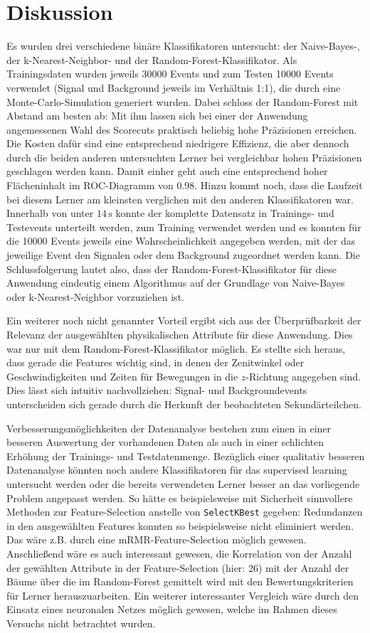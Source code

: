 \section{Diskussion}
\label{sec:Diskussion}

Es wurden drei verschiedene binäre Klassifikatoren untersucht: der Naive-Bayes-, der k-Nearest-Neighbor- und der Random-Forest-Klassifikator. Als Trainingsdaten wurden jeweils 30000 Events und zum Testen 10000 Events verwendet (Signal und Background jeweils im Verhältnis 1:1), die durch eine Monte-Carlo-Simulation generiert wurden. Dabei schloss der Random-Forest mit Abstand am besten ab: Mit ihm lassen sich bei einer der Anwendung angemessenen Wahl des Scorecuts praktisch beliebig hohe Präzisionen erreichen. Die Kosten dafür sind eine entsprechend niedrigere Effizienz, die aber dennoch durch die beiden anderen untersuchten Lerner bei vergleichbar hohen Präzisionen geschlagen werden kann. Damit einher geht auch eine entsprechend hoher Flächeninhalt im ROC-Diagramm von 0.98. Hinzu kommt noch, dass die Laufzeit bei diesem Lerner am kleinsten verglichen mit den anderen Klassifikatoren war. Innerhalb von unter $14 \, \text{s}$ konnte der komplette Datensatz in Trainings- und  Testevents unterteilt werden, zum Training verwendet werden und es konnten für die 10000 Events jeweils eine Wahrscheinlichkeit angegeben werden, mit der das jeweilige Event den Signalen oder dem Background zugeordnet werden kann. Die Schlussfolgerung lautet also, dass der Random-Forest-Klassifikator für diese Anwendung eindeutig einem Algorithmus auf der Grundlage von Naive-Bayes oder k-Nearest-Neighbor vorzuziehen ist.

Ein weiterer noch nicht genannter Vorteil ergibt sich aus der Überprüfbarkeit der Relevanz der ausgewählten physikalischen Attribute für diese Anwendung. Dies war nur mit dem Random-Forest-Klassifikator möglich. Es stellte sich heraus, dass gerade die Features wichtig sind, in denen der Zenitwinkel oder Geschwindigkeiten und Zeiten für Bewegungen in die $z$-Richtung angegeben sind. Dies lässt sich intuitiv nachvollziehen: Signal- und Backgroundevents unterscheiden sich gerade durch die Herkunft der beobachteten Sekundärteilchen.

Verbesserungsmöglichkeiten der Datenanalyse bestehen zum einen in einer besseren Auswertung der vorhandenen Daten als auch in einer schlichten Erhöhung der Trainings- und Testdatenmenge. Bezüglich einer qualitativ besseren Datenanalyse könnten noch andere Klassifikatoren für das supervised learning untersucht werden oder die bereits verwendeten Lerner besser an das vorliegende Problem angepasst werden. So hätte es beispielsweise mit Sicherheit sinnvollere Methoden zur Feature-Selection anstelle von \texttt{SelectKBest} gegeben: Redundanzen in den ausgewählten Features konnten so beispielsweise nicht eliminiert werden. Das wäre z.B. durch eine mRMR-Feature-Selection möglich gewesen. Anschließend wäre es auch interessant gewesen, die Korrelation von der Anzahl der gewählten Attribute in der Feature-Selection (hier: 26) mit der Anzahl der Bäume über die im Random-Forest gemittelt wird mit den Bewertungskriterien für Lerner herauszuarbeiten. Ein weiterer interessanter Vergleich wäre durch den Einsatz eines neuronalen Netzes möglich gewesen, welche im Rahmen dieses Versuchs nicht betrachtet wurden.